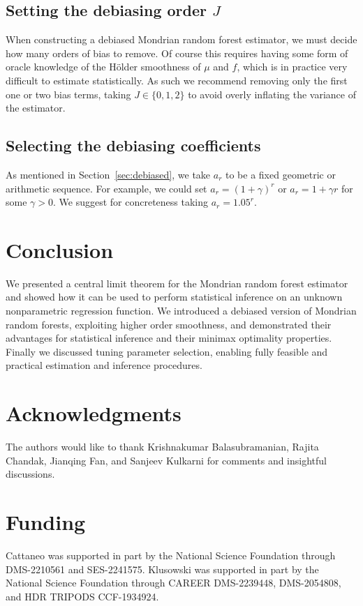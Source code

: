 \subsection{Setting the debiasing order \texorpdfstring{$J$}{J}}%

When constructing a debiased Mondrian random forest estimator,
we must decide how many orders of bias to remove.
Of course this requires having some form of oracle knowledge of the
H{\"o}lder smoothness of $\mu$ and $f$,
which is in practice very difficult to estimate statistically.
As such we recommend removing only the first one or two
bias terms, taking $J \in \{0,1,2\}$
to avoid overly inflating the variance of the estimator.

\subsection{Selecting the debiasing coefficients}%

As mentioned in Section~\ref{sec:debiased},
we take $a_r$ to be a fixed geometric or arithmetic sequence.
For example, we could set
$a_r = (1+\gamma)^r$
or $a_r = 1 + \gamma r$ for some $\gamma > 0$.
We suggest for concreteness taking $a_r = 1.05^r$.

\section{Conclusion}%
\label{sec:mondrian_conclusion}

We presented a central limit theorem for the Mondrian random forest
estimator and showed how it can be used to perform statistical inference
on an unknown nonparametric regression function.
We introduced a debiased version of Mondrian random forests, exploiting higher
order smoothness, and
demonstrated their advantages for statistical inference and their
minimax optimality properties.
Finally we discussed tuning parameter selection, enabling fully
feasible and practical estimation and inference procedures.

\section{Acknowledgments}

The authors would like to thank Krishnakumar Balasubramanian,
Rajita Chandak, Jianqing Fan, and Sanjeev Kulkarni for
comments and insightful discussions.

\section{Funding}

Cattaneo was supported in part by the National Science Foundation through
DMS-2210561 and SES-2241575.
Klusowski was supported in part by the National Science Foundation
through CAREER DMS-2239448, DMS-2054808, and HDR TRIPODS CCF-1934924.


